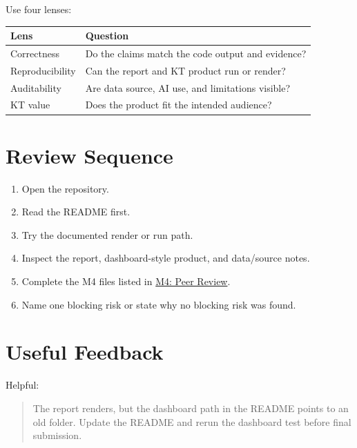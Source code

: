 \documentclass[
  letterpaper,
  DIV=11,
  numbers=noendperiod,
  oneside]{scrreprt}
\providecommand{\tightlist}{%
  \setlength{\itemsep}{0pt}\setlength{\parskip}{0pt}}
\begin{document}

Use four lenses:

\begin{longtable}[]{@{}ll@{}}
\toprule\noalign{}
Lens & Question \\
\midrule\noalign{}
\endhead
\bottomrule\noalign{}
\endlastfoot
Correctness & Do the claims match the code output and evidence? \\
Reproducibility & Can the report and KT product run or render? \\
Auditability & Are data source, AI use, and limitations visible? \\
KT value & Does the product fit the intended audience? \\
\end{longtable}

\section*{Review Sequence}\label{review-sequence}


\begin{enumerate}
\def\labelenumi{\arabic{enumi}.}
\tightlist
\item
  Open the repository.
\item
  Read the README first.
\item
  Try the documented render or run path.
\item
  Inspect the report, dashboard-style product, and data/source notes.
\item
  Complete the M4 files listed in
  \href{../../milestones/m4-peer-review/README.md}{M4: Peer Review}.
\item
  Name one blocking risk or state why no blocking risk was found.
\end{enumerate}

\section*{Useful Feedback}\label{useful-feedback}


Helpful:

\begin{quote}
The report renders, but the dashboard path in the README points to an
old folder. Update the README and rerun the dashboard test before final
submission.
\end{quote}
\end{document}
